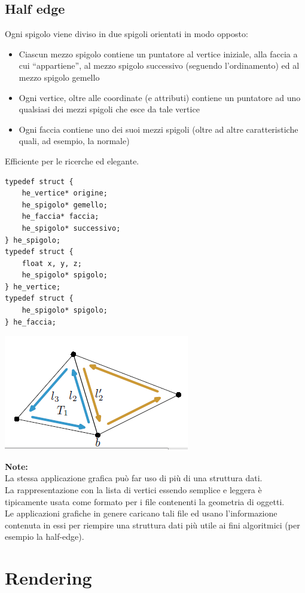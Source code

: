 \documentclass[a4paper, 10pt]{article}
\begin{document}
	\subsection{Half edge}
		Ogni spigolo viene diviso in due spigoli
		orientati in modo opposto:
		\begin{itemize}
			\item Ciascun mezzo spigolo contiene un puntatore
			al vertice iniziale, alla faccia a cui “appartiene”,
			al mezzo spigolo successivo (seguendo
			l’ordinamento) ed al mezzo spigolo gemello
			\item Ogni vertice, oltre alle coordinate (e attributi)
			contiene un puntatore ad uno qualsiasi dei
			mezzi spigoli che esce da tale vertice
			\item Ogni faccia contiene uno dei suoi mezzi spigoli
			(oltre ad altre caratteristiche quali, ad
			esempio, la normale)
		\end{itemize}
		Efficiente per le ricerche ed elegante.
		
		\begin{multicols}{2}		
	\begin{lstlisting}
typedef struct {
	he_vertice* origine;
	he_spigolo* gemello;
	he_faccia* faccia;
	he_spigolo* successivo;
} he_spigolo;
typedef struct {
	float x, y, z;
	he_spigolo* spigolo;
} he_vertice;
typedef struct {
	he_spigolo* spigolo;
} he_faccia;
	\end{lstlisting}
		
		\columnbreak
		
		\vspace*{1cm}
		\includegraphics[scale=0.5]{mesh2}
	\end{multicols}
		
	\noindent
	\textbf{Note:}\\
	La stessa applicazione grafica può far uso di più di una
	struttura dati.\\
	La rappresentazione con la lista di vertici essendo semplice e
	leggera è tipicamente usata come formato per i file
	contenenti la geometria di oggetti.\\
	Le applicazioni grafiche in genere caricano tali file ed usano
	l’informazione contenuta in essi per riempire una struttura
	dati più utile ai fini algoritmici (per esempio la half-edge).
	
	
	\section{Rendering}
\end{document}
